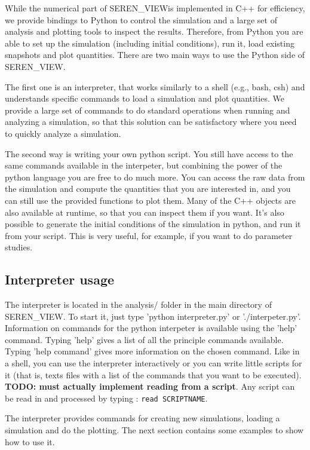 \documentclass[a4paper]{article}
\newcommand{\CODENAME}{SEREN\_VIEW}
\newcommand{\var}[1]{\texttt{#1}}
\begin{document}
While the numerical part of \CODENAME  is implemented in C++ for efficiency, we provide bindings to Python to control the simulation and a large set of analysis and plotting tools to inspect the results. Therefore, from Python you are able to set up the simulation (including initial conditions), run it, load existing snapshots and plot quantities. There are two main ways to use the Python side of \CODENAME.

The first one is an interpreter, that works similarly to a shell (e.g., bash, csh) and understands specific commands to load a simulation and plot quantities. We provide a large set of commands to do standard operations when running and analyzing a simulation, so that this solution can be satisfactory where you need to quickly analyze a simulation.

The second way is writing your own python script. You still have access to the same commands available in the interpeter, but combining the power of the python language you are free to do much more. You can access the raw data from the simulation and compute the quantities that you are interested in, and you can still use the provided functions to plot them. Many of the C++ objects are also available at runtime, so that you can inspect them if you want. It's also possible to generate the initial conditions of the simulation in python, and run it from your script. This is very useful, for example, if you want to do parameter studies.


\subsection{Interpreter usage}

The interpreter is located in the analysis/ folder in the main directory of \CODENAME. To start it, just type 'python interpreter.py' or './interpeter.py'.
Information on commands for the python interpeter is available using the 'help' command.  Typing 'help' gives a list of all the principle commands available.  Typing 'help command' gives more information on the chosen command.
Like in a shell, you can use the interpreter interactively or you can write little scripts for it (that is, texts files with a list of the commands that you want to be executed). \textbf{TODO: must actually implement reading from a script}. Any script can be read in and processed by typing : \var{read SCRIPTNAME}.

The interpreter provides commands for creating new simulations, loading a simulation and do the plotting. The next section contains some examples to show how to use it.
\end{document}
